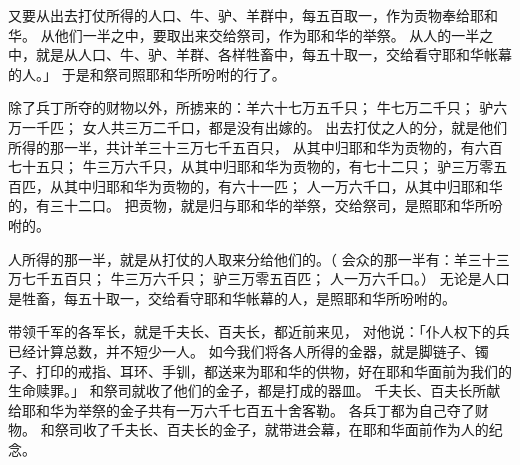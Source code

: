 {又要从出去打仗所得的人口、牛、驴、羊群中，每五百取一，作为贡物奉给耶和华。
从他们一半之中，要取出来交给祭司{}，作为耶和华的举祭。
从{}人的一半之中，就是从人口、牛、驴、羊群、各样牲畜中，每五十取一，交给看守耶和华帐幕的{}人。」
于是{}和祭司{}照耶和华所吩咐{}的行了。
\par }{\PP {}除了兵丁所夺的财物以外，所掳来的：羊六十七万五千只；
牛七万二千只；
驴六万一千匹；
女人共三万二千口，都是没有出嫁的。
出去打仗之人的分，就是他们所得的那一半，共计羊三十三万七千五百只，
从其中归耶和华为贡物的，有六百七十五只；
牛三万六千只，从其中归耶和华为贡物的，有七十二只；
驴三万零五百匹，从其中归耶和华为贡物的，有六十一匹；
人一万六千口，从其中归耶和华的，有三十二口。
把贡物，就是归与耶和华的举祭，交给祭司{}，是照耶和华所吩咐{}的。
\par }{\PP {}人所得的那一半，就是{}从打仗的人取来分给他们的。（
会众的那一半有：羊三十三万七千五百只；
牛三万六千只；
驴三万零五百匹；
人一万六千口。）
无论是人口是牲畜，{}每五十取一，交给看守耶和华帐幕的{}人，是照耶和华所吩咐{}的。
\par }{\PP {}带领千军的各军长，就是千夫长、百夫长，都近前来见{}，
对他说：「仆人权下的兵已经计算总数，并不短少一人。
如今我们将各人所得的金器，就是脚链子、镯子、打印的戒指、耳环、手钏，都送来为耶和华的供物，好在耶和华面前为我们的生命赎罪。」
和祭司{}就收了他们的金子，都是打成的器皿。
千夫长、百夫长所献给耶和华为举祭的金子共有一万六千七百五十舍客勒。
各兵丁都为自己夺了财物。
和祭司{}收了千夫长、百夫长的金子，就带进会幕，在耶和华面前作为{}人的纪念。

}
